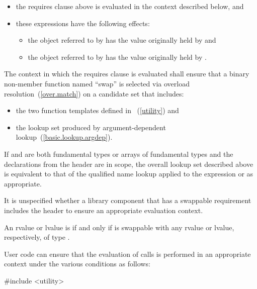 \begin{addedblock}
\begin{itemdescr}
\begin{itemize}
\item the requires clause above is evaluated in the context described below, and

\item these expressions have the following effects:

\begin{itemize}
\item the object referred to by  has the value originally held by  and
\item the object referred to by  has the value originally held by .
\end{itemize}
\end{itemize}

\pnum
The context in which the requires clause is evaluated shall
ensure that a binary non-member function named ``swap'' is selected via overload
resolution~(\ref{over.match}) on a candidate set that includes:

\begin{itemize}
\item the two  function templates defined in
~(\ref{utility}) and

\item the lookup set produced by argument-dependent lookup~(\ref{basic.lookup.argdep}).
\end{itemize}

\enternote If  and  are both fundamental types or arrays of
fundamental types and the declarations from the header  are in
scope, the overall lookup set described above is equivalent to that of the
qualified name lookup applied to the expression  or
 as appropriate. \exitnote

\enternote It is unspecified whether a library component that has a swappable
requirement includes the header  to ensure an appropriate
evaluation context. \exitnote

\pnum
An rvalue or lvalue  is  if and only if  is
swappable with any rvalue or lvalue, respectively, of type .

\enterexample User code can ensure that the evaluation of  calls
is performed in an appropriate context under the various conditions as follows:
\begin{codeblock}
#include <utility>


\end{codeblock}
\end{itemdescr}
\end{addedblock}
